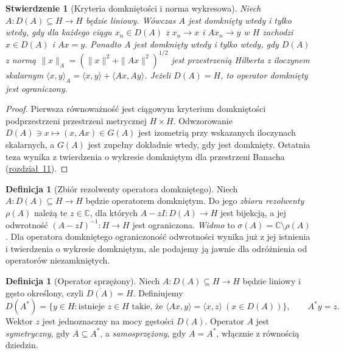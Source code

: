 \documentclass[11pt,a4paper]{article}
\numberwithin{equation}{section}
\theoremstyle{plain}
\newtheorem{stwierdzenie}[twierdzenie]{Stwierdzenie}
\theoremstyle{definition}
\newtheorem{definicja}[twierdzenie]{Definicja}
\theoremstyle{remark}
\newcommand{\C}{\mathbb C}
\begin{document}
\begin{stwierdzenie}[Kryteria domkniętości i norma wykresowa]
\label{prop:graph33}
Niech $A:D(A)\subseteq H\to H$ będzie liniowy.
Wówczas $A$ jest domknięty wtedy i tylko wtedy, gdy dla każdego
ciągu $x_n\in D(A)$ z $x_n\to x$ i $Ax_n\to y$ w $H$ zachodzi
$x\in D(A)$ i $Ax=y$. Ponadto $A$ jest domknięty wtedy i tylko wtedy,
gdy $D(A)$ z normą $\|x\|_A=(\|x\|^2+\|Ax\|^2)^{1/2}$ jest
przestrzenią Hilberta z iloczynem skalarnym
$\langle x,y\rangle_A=\langle x,y\rangle+\langle Ax,Ay\rangle$.
Jeżeli $D(A)=H$, to operator domknięty jest ograniczony.
\end{stwierdzenie}
\begin{proof}
Pierwsza równoważność jest ciągowym kryterium domkniętości
podprzestrzeni przestrzeni metrycznej $H\times H$.
Odwzorowanie $D(A)\ni x\mapsto(x,Ax)\in G(A)$ jest izometrią
przy wskazanych iloczynach skalarnych, a $G(A)$ jest zupełny dokładnie
wtedy, gdy jest domknięty. Ostatnia teza wynika z twierdzenia
o wykresie domkniętym dla przestrzeni Banacha
(\hyperref[sec:frechet-open-graph]{rozdział~11}).
\end{proof}

\begin{definicja}[Zbiór rezolwenty operatora domkniętego]
Niech $A:D(A)\subseteq H\to H$ będzie operatorem domkniętym.
Do jego \emph{zbioru rezolwenty} $\rho(A)$ należą te $z\in\C$,
dla których $A-zI:D(A)\to H$ jest bijekcją, a jej
odwrotność $(A-zI)^{-1}:H\to H$ jest ograniczona.
\emph{Widmo} to $\sigma(A)=\C\setminus\rho(A)$.
Dla operatora domkniętego ograniczoność odwrotności wynika już
z jej istnienia i twierdzenia o wykresie domkniętym,
ale podajemy ją jawnie dla odróżnienia od operatorów niezamkniętych.
\end{definicja}

\begin{definicja}[Operator sprzężony]
\label{def:adjoint33}
Niech $A:D(A)\subseteq H\to H$ będzie liniowy i gęsto określony,
czyli $\overline{D(A)}=H$. Definiujemy
\[
 D(A^*)=\{y\in H:\text{istnieje }z\in H\text{ takie, że }
 \langle Ax,y\rangle=\langle x,z\rangle\ (x\in D(A))\},
 \qquad A^*y=z.
\]
Wektor $z$ jest jednoznaczny na mocy gęstości $D(A)$.
Operator $A$ jest \emph{symetryczny}, gdy $A\subseteq A^*$,
a \emph{samosprzężony}, gdy $A=A^*$, włącznie z równością dziedzin.
\end{definicja}
\end{document}
